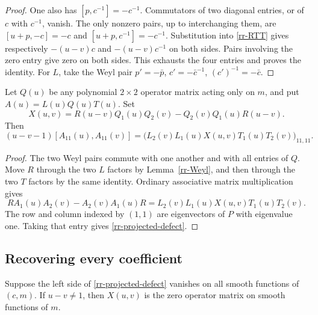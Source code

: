 \begin{proof}
One also has $[p,c^{-1}]=-c^{-1}$.
Commutators of two diagonal entries, or of $c$ with
$c^{-1}$, vanish.  The only nonzero pairs, up to
interchanging them, are
$[u+p,-c]=-c$ and $[u+p,c^{-1}]=-c^{-1}$.
Substitution into \eqref{rr-RTT} gives respectively
$-(u-v)c$ and $-(u-v)c^{-1}$ on both sides.
Pairs involving the zero entry give zero on both
sides.  This exhausts the four entries and proves
the identity.
For $L$, take the Weyl pair
$p'=-\bar p$, $c'=-\bar c^{-1}$,
$(c')^{-1}=-\bar c$.
\end{proof}

\begin{lemma}\label{rr-defect}
Let $Q(u)$ be any polynomial $2\times2$ operator
matrix acting only on $m$, and put $A(u)=L(u)Q(u)T(u)$.
Set
\[
 X(u,v)=R(u-v)Q_1(u)Q_2(v)
                         -Q_2(v)Q_1(u)R(u-v).
\]
Then
\begin{equation}\label{rr-projected-defect}
 (u-v-1)[A_{11}(u),A_{11}(v)]
  =\bigl(L_2(v)L_1(u)X(u,v)T_1(u)T_2(v)\bigr)_{11,11}.
\end{equation}
\end{lemma}

\begin{proof}
The two Weyl pairs commute with one another and with
all entries of $Q$.  Move $R$ through the two $L$
factors by Lemma~\ref{rr-Weyl}, and then through the
two $T$ factors by the same identity.  Ordinary
associative matrix multiplication gives
\[
 R A_1(u)A_2(v)-A_2(v)A_1(u)R
                       =L_2(v)L_1(u)X(u,v)T_1(u)T_2(v).
\]
The row and column indexed by $(1,1)$ are eigenvectors
of $P$ with eigenvalue one.  Taking that entry gives
\eqref{rr-projected-defect}.
\end{proof}

\subsection{Recovering every coefficient}

\begin{lemma}\label{rr-independence}
Suppose the left side of
\eqref{rr-projected-defect} vanishes on all smooth
functions of $(c,m)$.  If $u-v\ne1$, then
$X(u,v)$ is the zero operator matrix on smooth
functions of $m$.
\end{lemma}

